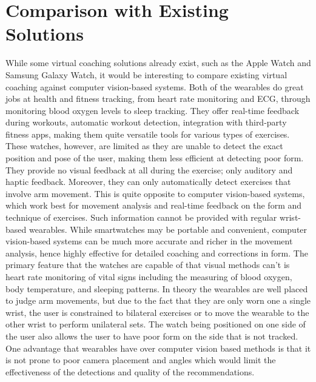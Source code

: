 \section{Comparison with Existing Solutions}
    While some virtual coaching solutions already exist, such as the Apple Watch and Samsung Galaxy Watch, it would be interesting to compare existing virtual coaching against computer vision-based systems. Both of the wearables do great jobs at health and fitness tracking, from heart rate monitoring and ECG, through monitoring blood oxygen levels to sleep tracking. They offer real-time feedback during workouts, automatic workout detection, integration with third-party fitness apps, making them quite versatile tools for various types of exercises. These watches, however, are limited as they are unable to detect the exact position and pose of the user, making them less efficient at detecting poor form. They provide no visual feedback at all during the exercise; only auditory and haptic feedback. Moreover, they can only automatically detect exercises that involve arm movement. This is quite opposite to computer vision-based systems, which work best for movement analysis and real-time feedback on the form and technique of exercises. Such information cannot be provided with regular wrist-based wearables. While smartwatches may be portable and convenient, computer vision-based systems can be much more accurate and richer in the movement analysis, hence highly effective for detailed coaching and corrections in form. The primary feature that the watches are capable of that visual methods can't is heart rate monitoring of vital signs including the measuring of blood oxygen, body temperature, and sleeping patterns. In theory the wearables are well placed to judge arm movements, but due to the fact that they are only worn one a single wrist, the user is constrained to bilateral exercises or to move the wearable to the other wrist to perform unilateral sets. The watch being positioned on one side of the user also allows the user to have poor form on the side that is not tracked. One advantage that wearables have over computer vision based methods is that it is not prone to poor camera placement and angles which would limit the effectiveness of the detections and quality of the recommendations.
